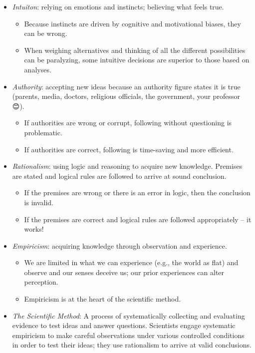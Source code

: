 \documentclass[
  english,
]{book}
\providecommand{\tightlist}{%
  \setlength{\itemsep}{0pt}\setlength{\parskip}{0pt}}
\begin{document}
\begin{itemize}
\tightlist
\item
  \emph{Intuiton}: relying on emotions and instincts; believing what feels true.

  \begin{itemize}
  \tightlist
  \item
    Because instincts are driven by cognitive and motivational biases, they can be wrong.
  \item
    When weighing alternatives and thinking of all the different possibilities can be paralyzing, some intuitive decisions are superior to those based on analyses.
  \end{itemize}
\item
  \emph{Authority}: accepting new ideas because an authority figure states it is true (parents, media, doctors, religious officials, the government, your professor 😊).

  \begin{itemize}
  \tightlist
  \item
    If authorities are wrong or corrupt, following without questioning is problematic.
  \item
    If authorities are correct, following is time-saving and more efficient.
  \end{itemize}
\item
  \emph{Rationalism}: using logic and reasoning to acquire new knowledge. Premises are stated and logical rules are followed to arrive at sound conclusion.

  \begin{itemize}
  \tightlist
  \item
    If the premises are wrong or there is an error in logic, then the conclusion is invalid.
  \item
    If the premises are correct and logical rules are followed appropriately -- it works!
  \end{itemize}
\item
  \emph{Empiricism}: acquiring knowledge through observation and experience.

  \begin{itemize}
  \tightlist
  \item
    We are limited in what we can experience (e.g., the world as flat) and observe and our senses deceive us; our prior experiences can alter perception.
  \item
    Empiricism is at the heart of the scientific method.
  \end{itemize}
\item
  \emph{The Scientific Method}: A process of systematically collecting and evaluating evidence to test ideas and answer questions. Scientists engage systematic empiricism to make careful observations under various controlled conditions in order to test their ideas; they use rationalism to arrive at valid conclusions.


\end{itemize}
\end{document}

